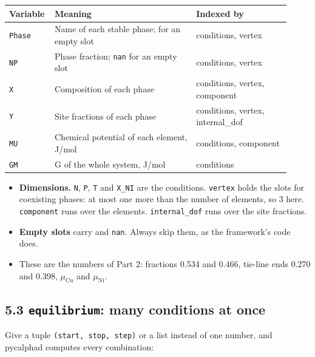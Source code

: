 \documentclass[12pt,a4paper]{article}
\begin{document}
\begingroup\small
\begin{longtable}{>{\raggedright\arraybackslash}p{0.121\linewidth}>{\raggedright\arraybackslash}p{0.480\linewidth}>{\raggedright\arraybackslash}p{0.320\linewidth}}
\toprule
\textbf{Variable} & \textbf{Meaning} & \textbf{Indexed by} \\
\midrule
\endhead
\texttt{Phase} & Name of each stable phase; \texttt{\textquotesingle{}\textquotesingle{}} for an empty slot & conditions, vertex \\
\texttt{NP} & Phase fraction; \texttt{nan} for an empty slot & conditions, vertex \\
\texttt{X} & Composition of each phase & conditions, vertex, component \\
\texttt{Y} & Site fractions of each phase & conditions, vertex, internal\_dof \\
\texttt{MU} & Chemical potential of each element, J/mol & conditions, component \\
\texttt{GM} & G of the whole system, J/mol & conditions \\
\bottomrule
\end{longtable}
\endgroup
\begin{itemize}
\item \textbf{Dimensions.} \texttt{N}, \texttt{P}, \texttt{T} and \texttt{X\_\allowbreak{}NI} are the conditions. \texttt{vertex} holds the slots for coexisting phases: at most one more than the number of elements, so 3 here. \texttt{component} runs over the elements. \texttt{internal\_\allowbreak{}dof} runs over the site fractions.
\item \textbf{Empty slots} carry \texttt{\textquotesingle{}\textquotesingle{}} and \texttt{nan}. Always skip them, as the framework's code does.
\item These are the numbers of Part 2: fractions 0.534 and 0.466, tie-line ends 0.270 and 0.398, \(\mu_{\mathrm{Cu}}\) and \(\mu_{\mathrm{Ni}}\).
\end{itemize}

\subsection*{5.3 \texttt{equilibrium}: many conditions at once}
Give a tuple \texttt{(start,\allowbreak{} stop,\allowbreak{} step)} or a list instead of one number, and pycalphad computes every combination:
\end{document}
